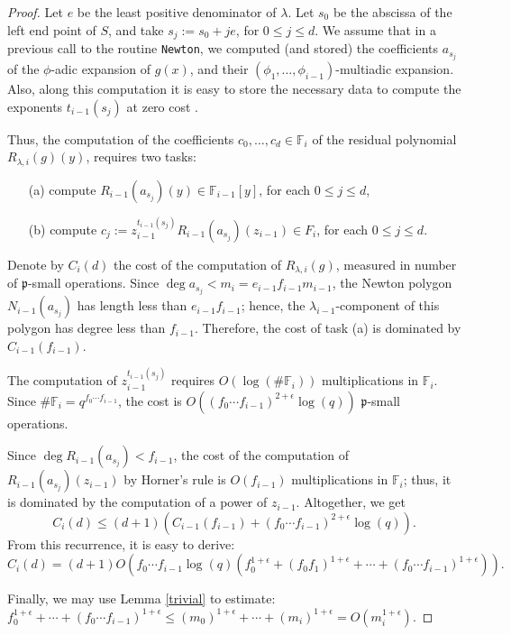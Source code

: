\documentclass{amsart}
\begin{document}
\begin{proof}Let $e$ be the least positive denominator of $\lambda$. Let $s_0$ be the abscissa of the left end point of $S$, and take $s_j:=s_0+je$, for $0\le j\le d$.
We assume that in a previous call to the routine {\tt Newton}, we computed (and stored) the coefficients $a_{s_j}$ of the $\phi$-adic expansion of $g(x)$, and their $(\phi_1,\dots,\phi_{i-1})$-multiadic expansion. Also, along this computation it is easy to store the necessary data to compute the exponents $t_{i-1}(s_j)$ at zero cost \cite[Def. 2.19]{HN}.

Thus, the computation of the coefficients $c_0,\dots,c_d\in {\mathbb F}_i$ of the residual polynomial $R_{\lambda,i}(g)(y)$, requires two tasks:
\begin{enumerate}
\item[(a)] compute $R_{i-1}(a_{s_j})(y)\in{\mathbb F}_{i-1}[y]$, for each $0\le j\le d$,

\item[(b)] compute $c_j:=z_{i-1}^{t_{i-1}(s_j)}R_{i-1}(a_{s_j})(z_{i-1})\in F_i$, for each $0\le j\le d$.
\end{enumerate}

Denote by $C_i(d)$ the cost of the computation of $R_{\lambda,i}(g)$, measured in number of ${\mathfrak{p}}$-small operations. Since $\deg a_{s_j}<m_i=e_{i-1}f_{i-1}m_{i-1}$, the Newton polygon $N_{i-1}(a_{s_j})$ has length less than $e_{i-1}f_{i-1}$; hence, the $\lambda_{i-1}$-component of this polygon has degree less than $f_{i-1}$. Therefore, the cost of task (a) is dominated by $C_{i-1}(f_{i-1})$.

The computation of $z_{i-1}^{t_{i-1}(s_j)}$ requires $O\left(\log(\#{\mathbb F}_i)\right)$ multiplications in ${\mathbb F}_i$. Since $\#{\mathbb F}_i=q^{f_0\cdots f_{i-1}}$, the cost is
$O\left((f_0\cdots f_{i-1})^{2+\epsilon}\log(q)\right)$ ${\mathfrak{p}}$-small operations. 

Since $\deg R_{i-1}(a_{s_j})<f_{i-1}$, the cost of the computation of $R_{i-1}(a_{s_j})(z_{i-1})$ by Horner's rule is $O(f_{i-1})$ multiplications in ${\mathbb F}_i$; thus, it is dominated by the computation of a power of $z_{i-1}$.
Altogether, we get 
$$C_i(d)\le (d+1)\left(C_{i-1}(f_{i-1})+(f_0\cdots f_{i-1})^{2+\epsilon}\log(q)\right).$$
From this recurrence, it is easy to derive:
$$
C_i(d)=(d+1)O\left(f_0\cdots f_{i-1}\log(q)\left(f_0^{1+\epsilon}+(f_0f_1)^{1+\epsilon}+\cdots+(f_0\cdots f_{i-1})^{1+\epsilon}\right)\right).
$$   

Finally, we may use Lemma \ref{trivial} to estimate:
$f_0^{1+\epsilon}+\cdots+(f_0\cdots f_{i-1})^{1+\epsilon}\le
\left(m_0\right)^{1+\epsilon}+\cdots+\left(m_i\right)^{1+\epsilon}=O\left(m_i^{1+\epsilon}\right)$.
\end{proof}
\end{document}
